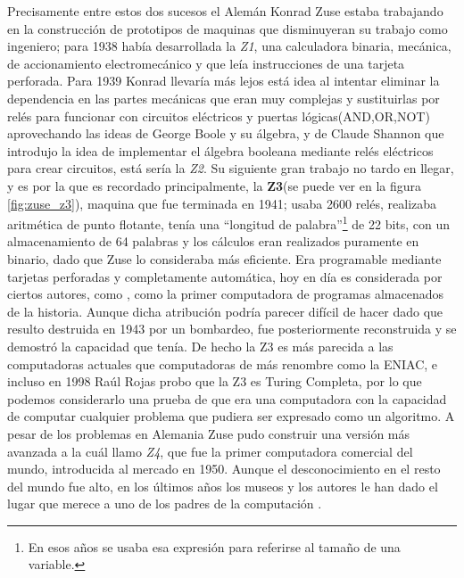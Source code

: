 \documentclass[letterpaper,12pt,oneside]{book}
\begin{document}
		
		Precisamente entre estos dos sucesos el Alemán Konrad
		Zuse estaba trabajando en la construcción de prototipos de maquinas que disminuyeran su trabajo como ingeniero; para 1938 había desarrollada la \textit{Z1},
		una calculadora binaria, mecánica, de accionamiento electromecánico y que leía instrucciones de una tarjeta perforada. Para 1939 Konrad llevaría más lejos está idea
		al intentar eliminar la dependencia en las partes mecánicas que eran muy complejas y sustituirlas por relés para funcionar con circuitos eléctricos y
		puertas lógicas(AND,OR,NOT) aprovechando las ideas de George Boole y su álgebra, y de Claude Shannon que introdujo la idea de implementar
		el álgebra booleana mediante relés eléctricos para crear circuitos, está sería la \textit{Z2}.	
		Su siguiente gran trabajo no tardo en llegar, y es por la que es recordado principalmente, la \textbf{Z3}(se puede ver en la figura \ref{fig:zuse_z3}), maquina que fue terminada en 1941; usaba 2600 relés, realizaba aritmética de punto flotante, tenía una ``longitud de palabra''\footnote{En esos años se usaba esa expresión para referirse al tamaño de una variable.} de 22 bits, con un almacenamiento de 64 palabras y los cálculos eran realizados puramente en binario, dado que Zuse lo consideraba más eficiente. Era programable mediante tarjetas
		perforadas y completamente automática, hoy en día es considerada por ciertos autores, como \cite{oregan_brief_2012}, como la primer computadora de programas almacenados de la historia.	
		Aunque dicha atribución podría parecer difícil de hacer
		dado que resulto destruida en 1943 por un bombardeo, fue posteriormente reconstruida y se demostró la capacidad que tenía. De hecho la Z3 es más parecida a las computadoras actuales que computadoras de más renombre como
		la ENIAC, e incluso en 1998 Raúl Rojas probo que la Z3 es Turing Completa, por lo que podemos considerarlo una prueba de que era
		una computadora con la capacidad de computar cualquier problema que pudiera ser expresado como un algoritmo. A pesar de los problemas en Alemania Zuse pudo construir
		una versión más avanzada a la cuál llamo \textit{Z4}, que fue la primer computadora comercial del mundo, introducida al mercado en 1950. Aunque el desconocimiento
		en el resto del mundo fue alto, en los últimos años los museos y los autores le han dado el lugar que merece a uno de los padres de la computación \cite[p.206]{ifrah_universal_2001}.
		
\end{document}

